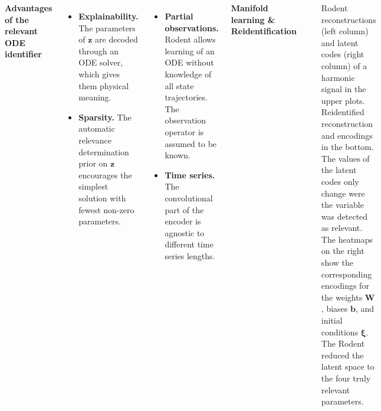 \documentclass[25pt]{tikzposter}
\begin{document}
\begin{columns}
{    \vspace{1cm}
    \begin{center}
      {\huge\bf Advantages of the relevant ODE identifier}\\
    \end{center}

    \vspace{1cm}
    \begin{minipage}[t]{.28\textwidth}
    \begin{itemize}
      \item \textbf{Explainability.}  The parameters of $\bm z$ are
        decoded through an ODE solver, which gives them physical meaning.
      \item \textbf{Sparsity.} The automatic relevance determination prior on
        $\bm{z}$ encourages the simplest solution with fewest non-zero parameters.
    \end{itemize}
    \end{minipage}
    \hspace{.01\textwidth}
    \begin{minipage}[t]{.28\textwidth}
    \begin{itemize}
      \item \textbf{Partial observations.} Rodent allows learning of an ODE
        without knowledge of all state trajectories. The
        observation operator is assumed to be known.
      \item \textbf{Time series.} The convolutional part of the encoder is
        agnostic to different time series lengths.
    \end{itemize}
    \end{minipage}


    \vspace{1cm}
    \begin{center}
      {\huge\bf Manifold learning \& Reidentification}\\
    \end{center}
    \begin{tikzfigure}
      \includegraphics[width=.50\textwidth]{single_enc_rec.pdf}
    \end{tikzfigure}
    Rodent reconstructions (left column) and latent codes (right column) of a
    harmonic signal in the upper plots. Reidentified reconstruction and
    encodings in the bottom.  The values of the latent codes only change were
    the variable was detected as relevant.  The heatmaps on the right show
    the corresponding encodings for the weights $\bm W$, biases $\bm b$, and
    initial conditions $\bm\xi$. The Rodent reduced
    the latent space to the four truly relevant parameters.
  }


\end{columns}
\end{document}
